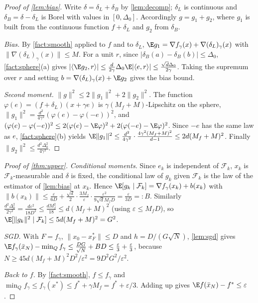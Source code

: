 \documentclass{article} %
\renewcommand{\eps}{\varepsilon}
\newcommand{\cF}{\mathcal{F}}
\newcommand{\ip}[2]{\langle #1,#2\rangle}
\newcommand{\norm}[1]{\lVert #1\rVert}
\theoremstyle{plain}
\theoremstyle{definition}
\theoremstyle{remark}
\begin{document}
\begin{proof}[Proof of \cref{lem:bias}]
Write $\delta=\delta_L+\delta_B$ by \cref{lem:decomp}; $\delta_L$ is continuous and $\delta_B=\delta-\delta_L$ is Borel with values in $[0,\Delta_0]$. Accordingly $g=g_1+g_2$, where $g_1$ is built from the continuous function $f+\delta_L$ and $g_2$ from $\delta_B$.

\emph{Bias.} By \cref{fact:smooth} applied to $f$ and to $\delta_L$, $\E g_1=\nabla f_\gamma(x)+\nabla(\delta_L)_\gamma(x)$ with $\norm{\nabla(\delta_L)_\gamma(x)}\le M$. For a unit $r$, since $|\delta_B(a)-\delta_B(b)|\le\Delta_0$, \cref{fact:sphere}(a) gives $|\ip{\E g_2}r|\le\frac d{2\gamma}\Delta_0\E|\ip er|\le\frac{\sqrt d\Delta_0}{2\gamma}$. Taking the supremum over $r$ and setting $b=\nabla(\delta_L)_\gamma(x)+\E g_2$ gives the bias bound.

\emph{Second moment.} $\norm g^2\le2\norm{g_1}^2+2\norm{g_2}^2$. The function $\varphi(e)=(f+\delta_L)(x+\gamma e)$ is $\gamma(M_f+M)$-Lipschitz on the sphere, $\norm{g_1}^2=\frac{d^2}{4\gamma^2}(\varphi(e)-\varphi(-e))^2$, and $(\varphi(e)-\varphi(-e))^2\le2(\varphi(e)-\E\varphi)^2+2(\varphi(-e)-\E\varphi)^2$. Since $-e$ has the same law as $e$, \cref{fact:sphere}(b) yields $\E\norm{g_1}^2\le\frac{d^2}{4\gamma^2}\cdot\frac{4\gamma^2(M_f+M)^2}{d-1}\le2d(M_f+M)^2$. Finally $\norm{g_2}^2\le\frac{d^2\Delta_0^2}{4\gamma^2}$.
\end{proof}

\begin{proof}[Proof of \cref{thm:upper}]
\emph{Conditional moments.} Since $e_k$ is independent of $\cF_k$, $x_k$ is $\cF_k$-measurable and $\delta$ is fixed, the conditional law of $g_k$ given $\cF_k$ is the law of the estimator of \cref{lem:bias} at $x_k$. Hence $\E[g_k\mid\cF_k]=\nabla f_\gamma(x_k)+b(x_k)$ with
$\norm{b(x_k)}\le\frac{\eps}{6D}+\frac{\sqrt d}{2}\cdot\frac{3M_f}{\eps}\cdot\frac{\eps^2}{9\sqrt dM_fD}=\frac{\eps}{3D}=:B$.
Similarly $\frac{d^2\Delta_0^2}{2\gamma^2}=\frac{d\eps^2}{18D^2}\le\frac{dM_f^2}{18}\le d(M_f+M)^2$ (using $\eps\le M_fD$), so $\E[\norm{g_k}^2\mid\cF_k]\le5d(M_f+M)^2=G^2$.

\emph{SGD.} With $F=f_\gamma$, $\norm{x_0-x_F^*}\le D$ and $h=D/(G\sqrt N)$, \cref{lem:sgd} gives $\E f_\gamma(\bar x_N)-\min_Qf_\gamma\le\frac{DG}{\sqrt N}+BD\le\frac\eps3+\frac\eps3$, because $N\ge45d(M_f+M)^2D^2/\eps^2=9D^2G^2/\eps^2$.

\emph{Back to $f$.} By \cref{fact:smooth}, $f\le f_\gamma$ and $\min_Qf_\gamma\le f_\gamma(x^*)\le f^*+\gamma M_f=f^*+\eps/3$. Adding up gives $\E f(\bar x_N)-f^*\le\eps$.
\end{proof}
\end{document}
